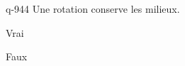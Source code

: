 \begin{truefalse}{q-944}
Une rotation conserve les milieux.
\item* Vrai
\item Faux
\end{truefalse}

